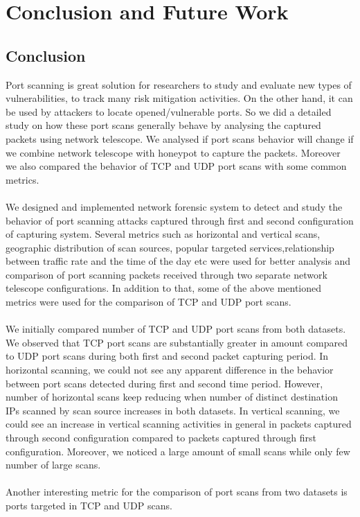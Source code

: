 \chapter{Conclusion and Future Work}
\section{Conclusion}
Port scanning is great solution for researchers to study and evaluate new types of vulnerabilities, to track many risk mitigation activities.
On the other hand, it can be used by attackers to locate opened/vulnerable ports.
So we did a detailed study on how these port scans generally behave by analysing the captured packets using network telescope.
We analysed if port scans behavior will change if we combine network telescope with honeypot to capture the packets.
Moreover we also compared the behavior of TCP and UDP port scans with some common metrics.\\\\
We designed and implemented network forensic system to detect and study the behavior of port scanning attacks captured through first and second configuration of capturing system.
Several metrics such as horizontal and vertical scans, geographic distribution of scan sources, popular targeted services,relationship between traffic rate and the time of the day etc were used for better analysis and comparison of port scanning packets received through two separate network telescope configurations.
In addition to that, some of the above mentioned metrics were used for the comparison of TCP and UDP port scans.\\\\
We initially compared number of TCP and UDP port scans from both datasets.
We observed that TCP port scans are substantially greater in amount compared to UDP port scans during both first and second packet capturing period.
In horizontal scanning, we could not see any apparent difference in the behavior between port scans detected during first and second time period. 
However, number of horizontal scans keep reducing when number of
distinct destination IPs scanned by scan source increases in both datasets.
In vertical scanning, we could see an increase in vertical scanning activities in general in packets captured through second configuration compared to packets captured through first configuration.
Moreover, we noticed a large amount of small scans while only few number of large scans.\\\\
Another interesting metric for the comparison of port scans from two datasets is ports targeted in TCP and UDP scans.
